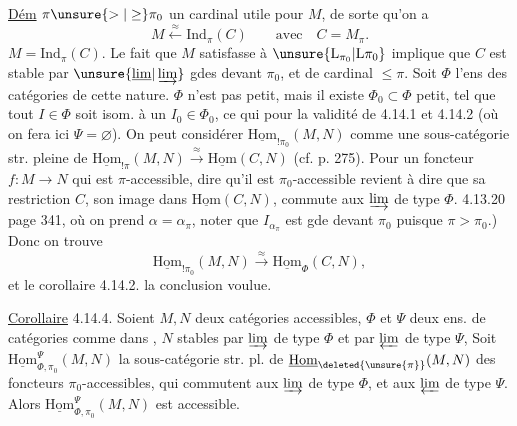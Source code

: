 \uline{Dém}    $\pi\unsure{>|\geq}\pi_0$ un cardinal  utile pour $M$, de sorte qu'on a
\[
M\xleftarrow{\approx}\mathrm{Ind}_{\pi}(C)\qquad\text{avec}\quad C=M_{\pi}.
\]
 $M=\mathrm{Ind}_{\pi}(C)$.  Le fait que $M$ satisfasse à $\unsure{\mathrm L_{\pi_0}|\mathrm L\pi_0}$ implique que $C$ est stable par $\unsure{\underline{\lim}|\varinjlim}$ gdes devant $\pi_0$, et de cardinal $\leq\pi$. Soit $\Phi$ l'ens des catégories de cette nature. \deleted{\unsure{$\xi$}} $\Phi$ n'est pas petit, mais il existe $\Phi_0\subset\Phi$  petit, tel que tout $I\in\Phi$ soit isom. à un $I_0\in\Phi_0$, ce qui  pour la validité de 4.14.1 et 4.14.2 (où on fera ici $\Psi=\varnothing$). On  peut considérer $\underline{\mathrm{Hom}}_{!\pi_0}(M,N)$ comme une  sous-catégorie str. pleine de $\underline{\mathrm{Hom}}_{!\pi}(M,N)\xrightarrow{\approx}\underline{\mathrm{Hom}}(C,N)$ (cf.  p. 275). Pour un foncteur $f:M\longrightarrow N$ qui est $\pi$-accessible, dire qu'il est \inserted{$=$} $\pi_0$-accessible revient à dire que sa restriction  $C$,  son image dans $\underline{\mathrm{Hom}}(C,N)$,  commute aux $\varinjlim$ de type $\Phi$.  4.13.20
 page 341, où on prend $\alpha=\alpha_{\pi}$, noter que $I_{\alpha_\pi}$ est gde devant $\pi_0$ puisque $\pi>\pi_0$.)
Donc on trouve
\[
\underline{\mathrm{Hom}}_{!\pi_0}(M,N)\xrightarrow{\approx}\underline{\mathrm{Hom}}_{\Phi}(C,N),
\]
et le corollaire 4.14.2.  la conclusion voulue.

\uline{Corollaire} 4.14.4. Soient $M,N$ deux catégories accessibles, $\Phi$ et $\Psi$ deux ens. de catégories comme dans ,     $N$   stables par $\varinjlim$ de type $\Phi$ et par $\varprojlim$ de type $\Psi$, Soit $\underline{\mathrm{Hom}}_{\Phi,\pi_0}^{\Psi}(M,N)$ la sous-catégorie str. pl. de $\underline{\mathrm{Hom}}_{\deleted{\unsure{\pi}}}(M,N)$  des foncteurs $\pi_0$-accessibles,  qui commutent aux $\varinjlim$ de type $\Phi$, et aux $\varprojlim$ de type $\Psi$. Alors $\underline{\mathrm{Hom}}_{\Phi,\pi_0}^{\Psi}(M,N)$ est accessible.

